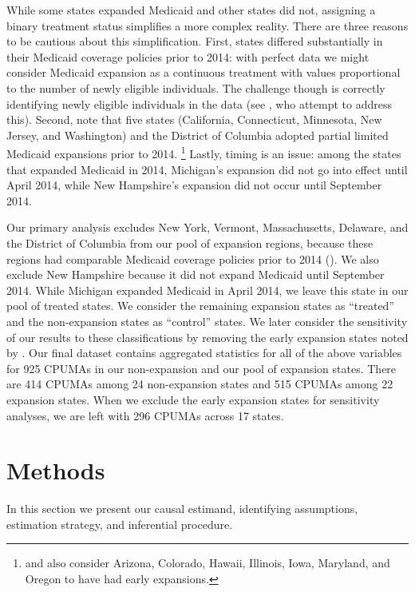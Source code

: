 \documentclass[aoas]{imsart}
\theoremstyle{plain}
\theoremstyle{remark}
\begin{document}
While some states expanded Medicaid and other states did not, assigning a binary treatment status simplifies a more complex reality. There are three reasons to be cautious about this simplification. First, states differed substantially in their Medicaid coverage policies prior to 2014: with perfect data we might consider Medicaid expansion as a continuous treatment with values proportional to the number of newly eligible individuals. The challenge though is correctly identifying newly eligible individuals in the data (see \cite{frean2017premium}, who attempt to address this). Second, \cite{frean2017premium} note that five states (California, Connecticut, Minnesota, New Jersey, and Washington) and the District of Columbia adopted partial limited Medicaid expansions prior to 2014. \footnote{\cite{kaestner2017effects} and \cite{courtemanche2017early} also consider Arizona, Colorado, Hawaii, Illinois, Iowa, Maryland, and Oregon to have had early expansions.} Lastly, timing is an issue: among the states that expanded Medicaid in 2014, Michigan's expansion did not go into effect until April 2014, while New Hampshire's expansion did not occur until September 2014.

Our primary analysis excludes New York, Vermont, Massachusetts, Delaware, and the District of Columbia from our pool of expansion regions, because these regions had comparable Medicaid coverage policies prior to 2014 (\cite{kaestner2017effects}). We also exclude New Hampshire because it did not expand Medicaid until September 2014. While Michigan expanded Medicaid in April 2014, we leave this state in our pool of treated states. We consider the remaining expansion states as ``treated'' and the non-expansion states as ``control'' states. We later consider the sensitivity of our results to these classifications by removing the early expansion states noted by \cite{frean2017premium}. Our final dataset contains aggregated statistics for all of the above variables for 925 CPUMAs in our non-expansion and our pool of expansion states. There are 414 CPUMAs among 24 non-expansion states and 515 CPUMAs among 22 expansion states. When we exclude the early expansion states for sensitivity analyses, we are left with 296 CPUMAs across 17 states.

\section{Methods}
\label{sec:methods}

In this section we present our causal estimand, identifying assumptions, estimation strategy, and inferential procedure.
\end{document}
